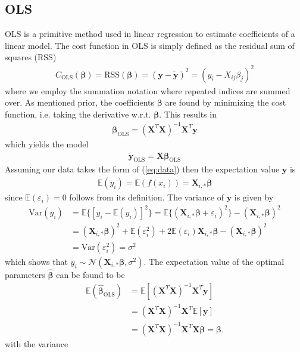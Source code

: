 \documentclass[%
reprint,
amsmath,amssymb,
aps,
]{revtex4-2}
\begin{document}
\subsection{OLS}
OLS is a primitive method used in linear regression to estimate coefficients of a linear model. The cost function in OLS is simply defined as the residual sum of squares (RSS)
\begin{align*}
	C_\text{OLS}(\bm\beta)=\text{RSS}(\bm\beta)=(\bm y-\tilde{\bm y})^2=(y_i-X_{ij}\beta_j)^2
\end{align*}
where we employ the summation notation where repeated indices are summed over. As mentioned prior, the coefficients $\bm\beta$ are found by minimizing the cost function, i.e. taking the derivative w.r.t. $\bm\beta$. This results in
\begin{align*}
	\bm\beta_\text{OLS}=(\bm X^T\bm X)^{-1}\bm X^T\bm y
\end{align*}
which yields the model
\begin{align}
	\tilde{\bm y}_\text{OLS}=\bm X\bm \beta_\text{OLS}
\end{align}
Assuming our data takes the form of (\ref{eq:data}) then the expectation value $\bm y$ is
\begin{align*}
	\mathbb{E}(y_i)=\mathbb{E}(f(x_i))=\bm X_{i,*}\bm\beta
\end{align*}
since $\mathbb{E}(\varepsilon_i)=0$ follows from its definition. The variance of $\bm y$ is given by
\begin{align*}
	\text{Var}(y_i)&=\mathbb{E}\{[y_i-\mathbb{E}(y_i)]^2\}=\mathbb{E}\{(\bm X_{i,*}\bm\beta+\varepsilon_i)^2\}-(\bm X_{i,*}\bm\beta)^2\\
	&=(\bm X_{i,*}\bm\beta)^2+\mathbb{E}(\varepsilon_i^2)+2\mathbb{E}(\varepsilon_i)\bm X_{i,*}\bm\beta-(\bm X_{i,*}\bm\beta)^2\\
	&=\text{Var}(\varepsilon_i^2)=\sigma^2
\end{align*}
which shows that $y_i\sim\mathcal{N}(\bm X_{i,*}\bm\beta,\sigma^2)$. The expectation value of the optimal parameters $\hat{\bm\beta}$ can be found to be
\begin{align*}
	\mathbb{E}(\hat{\bm\beta}_\text{OLS})&=\mathbb{E}[ (\bm X^T\bm X)^{-1}\bm X^T\bm y]\\
	&=(\bm X^T\bm X)^{-1}\bm X^T \mathbb{E}[\bm y]\\
	&=(\bm X^T\bm X)^{-1}\bm X^T\bm X\bm\beta=\bm\beta.
\end{align*}
with the variance
\end{document}
